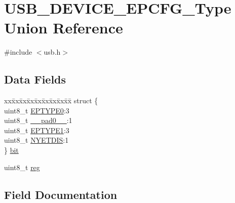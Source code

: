 \hypertarget{union_u_s_b___d_e_v_i_c_e___e_p_c_f_g___type}{}\section{U\+S\+B\+\_\+\+D\+E\+V\+I\+C\+E\+\_\+\+E\+P\+C\+F\+G\+\_\+\+Type Union Reference}
\label{union_u_s_b___d_e_v_i_c_e___e_p_c_f_g___type}


{\ttfamily \#include $<$usb.\+h$>$}

\subsection*{Data Fields}
\begin{DoxyCompactItemize}
\item 
\begin{tabbing}
xx\=xx\=xx\=xx\=xx\=xx\=xx\=xx\=xx\=\kill
struct \{\\
\>uint8\_t \mbox{\hyperlink{union_u_s_b___d_e_v_i_c_e___e_p_c_f_g___type_a29f02c077ad9b88b3474534f4bcdff60}{EPTYPE0}}:3\\
\>uint8\_t \mbox{\hyperlink{union_u_s_b___d_e_v_i_c_e___e_p_c_f_g___type_a8b4eebe79ded0459acec2f4950102ba3}{\_\_pad0\_\_}}:1\\
\>uint8\_t \mbox{\hyperlink{union_u_s_b___d_e_v_i_c_e___e_p_c_f_g___type_a810d490b86535214cb1c09b06b2dbb55}{EPTYPE1}}:3\\
\>uint8\_t \mbox{\hyperlink{union_u_s_b___d_e_v_i_c_e___e_p_c_f_g___type_a6a127454683ed358f972442f893ae2ba}{NYETDIS}}:1\\
\} \mbox{\hyperlink{union_u_s_b___d_e_v_i_c_e___e_p_c_f_g___type_ac9d32f6b12686d5ee63a0f6ee381193f}{bit}}\\

\end{tabbing}\item 
uint8\+\_\+t \mbox{\hyperlink{union_u_s_b___d_e_v_i_c_e___e_p_c_f_g___type_a9428adc9af4653a2050e2536b55dec8d}{reg}}
\end{DoxyCompactItemize}


\subsection{Field Documentation}
\mbox{\label{union_u_s_b___d_e_v_i_c_e___e_p_c_f_g___type_a8b4eebe79ded0459acec2f4950102ba3}} 

